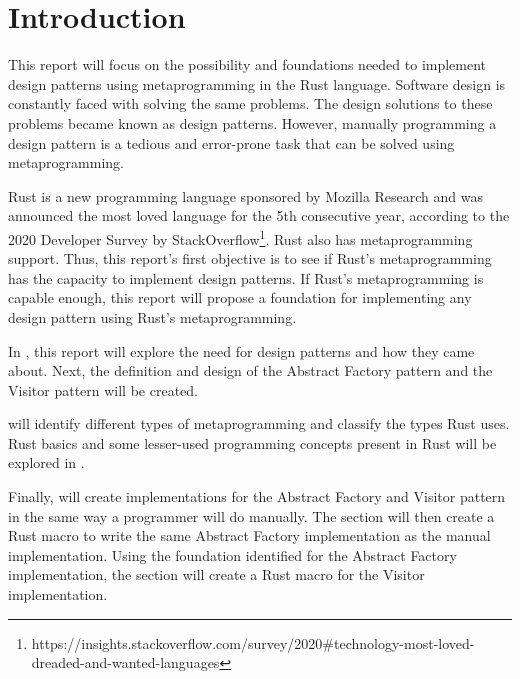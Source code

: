 \section{Introduction}
This report will focus on the possibility and foundations needed to implement design patterns using metaprogramming in the Rust language.
Software design is constantly faced with solving the same problems.
The design solutions to these problems became known as design patterns.
However, manually programming a design pattern is a tedious and error-prone task that can be solved using metaprogramming.

Rust is a new programming language sponsored by Mozilla Research and was announced the most loved language for the 5th consecutive year, according to the 2020 Developer Survey by StackOverflow\footnote{https://insights.stackoverflow.com/survey/2020\#technology-most-loved-dreaded-and-wanted-languages}.
Rust also has metaprogramming support.
Thus, this report's first objective is to see if Rust's metaprogramming has the capacity to implement design patterns.
If Rust's metaprogramming is capable enough, this report will propose a foundation for implementing any design pattern using Rust's metaprogramming.

In , this report will explore the need for design patterns and how they came about.
Next, the definition and design of the Abstract Factory pattern and the Visitor pattern will be created.

 will identify different types of metaprogramming and classify the types Rust uses.
Rust basics and some lesser-used programming concepts present in Rust will be explored in .

Finally,  will create implementations for the Abstract Factory and Visitor pattern in the same way a programmer will do manually.
The section will then create a Rust macro to write the same Abstract Factory implementation as the manual implementation.
Using the foundation identified for the Abstract Factory implementation, the section will create a Rust macro for the Visitor implementation.